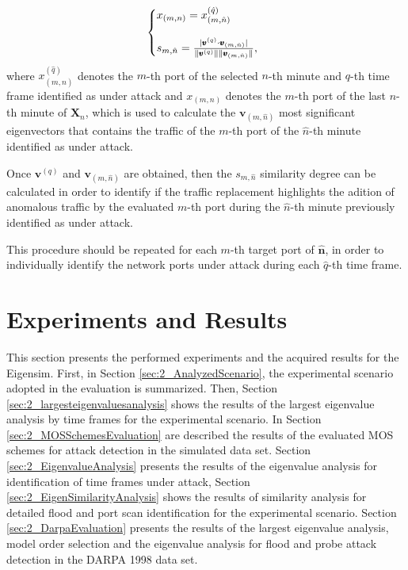 \begin{equation}\label{eq:2.15}
  \left\{
  \begin{array}{@{}ll@{}}
    x_{(m,n)} = x^{(\hat{q})}_{(m,\hat{n})} \\
    \\
    s_{m,\hat{n}} = \frac{\abs{\pmb{v}^{(q)} \cdot \pmb{v}_{(m,\hat{n})}}}{\norm{\pmb{v}^{(q)}}\norm{\pmb{v}_{(m,\hat{n})}}},
  \end{array}\right.
\end{equation}
where $x^{(\hat{q})}_{(m,\hat{n})}$ denotes the $m$-th port of the selected $n$-th minute and $q$-th time frame identified as under attack and $x_{(m,n)}$ denotes the $m$-th port of the last $n$-th minute of $\pmb{X}_n$, which is used to calculate the $\pmb{v}_{(m,\hat{n})}$ most significant eigenvectors that contains the traffic of the $m$-th port of the $\hat{n}$-th minute identified as under attack.

Once $\pmb{v}^{(q)}$ and $\pmb{v}_{(m,\hat{n})}$ are obtained, then the $s_{m,\hat{n}}$ similarity degree can be calculated in order to identify if the traffic replacement highlights the adition of anomalous traffic by the evaluated $m$-th port during the $\hat{n}$-th minute previously identified as under attack. 

This procedure should be repeated for each $m$-th target port of $\hat{\pmb{n}}$, in order to individually identify the network ports under attack during each $\hat{q}$-th time frame.


\section{Experiments and Results}
\label{sec:2_experimentalresults}

This section presents the performed experiments and the acquired results for the Eigensim. First, in Section \ref{sec:2_AnalyzedScenario}, the experimental scenario adopted in the evaluation is summarized. Then, Section \ref{sec:2_largesteigenvaluesanalysis} shows the results of the largest eigenvalue analysis by time frames for the experimental scenario. In Section \ref{sec:2_MOSSchemesEvaluation} are described the results of the evaluated MOS schemes for attack detection in the simulated data set. Section \ref{sec:2_EigenvalueAnalysis} presents the results of the eigenvalue analysis for identification of time frames under attack, Section \ref{sec:2_EigenSimilarityAnalysis} shows the results of similarity analysis for detailed flood and port scan identification for the experimental scenario. Section \ref{sec:2_DarpaEvaluation} presents the results of the largest eigenvalue analysis, model order selection and the eigenvalue analysis for flood and probe attack detection in the DARPA 1998 data set.

